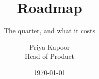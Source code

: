 \documentclass[aspectratio=169,11pt]{beamer}
\title{Roadmap}
\subtitle{The quarter, and what it costs}
\author{Priya Kapoor \\ \small Head of Product}
\date{\today}
\begin{document}
\titleslide





\end{document}
